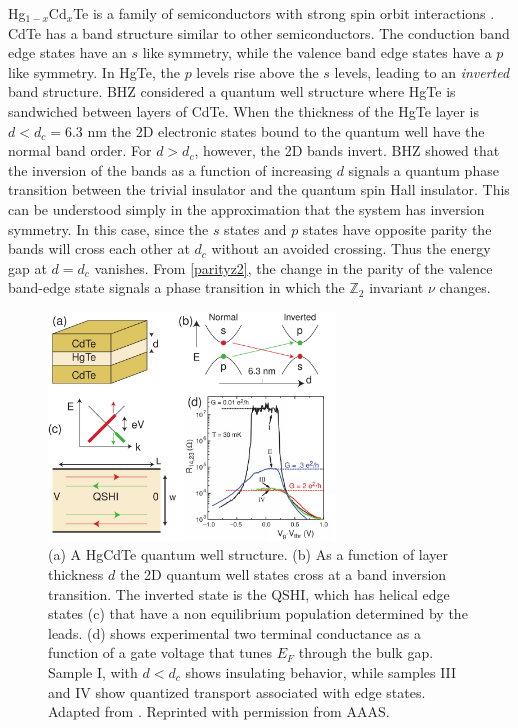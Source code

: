 \documentclass[twocolumn,floatfix,showpacs,rmp,aps]{revtex4}
\begin{document}
	
	Hg$_{1-x}$Cd$_x$Te is a family of semiconductors with strong spin orbit
	interactions \cite{dornhaus83}.  CdTe has a band structure similar to other
	semiconductors.  The conduction band edge states have an $s$ like symmetry,
	while the valence band edge states have a $p$ like symmetry.
	In HgTe, the $p$ levels rise above the $s$ levels, leading to an {\it inverted}
	band structure.  BHZ considered a quantum well structure where HgTe is
	sandwiched between layers of CdTe.  When the thickness of the HgTe layer is
	$d < d_c= 6.3$ nm the 2D electronic states bound to the quantum well have the
	normal band order.  For $d > d_c$, however, the 2D bands
	invert.  BHZ showed that the inversion of the bands as a function of increasing $d$ signals a
	quantum phase transition between the trivial insulator and the quantum spin
	Hall insulator.   This can be understood simply in the approximation that
	the system has inversion symmetry.  In this case, since the $s$ states
	and $p$ states have opposite parity the bands will cross each other at $d_c$ without
	an avoided crossing.  Thus the energy gap at $d=d_c$ vanishes.
	From \eqref{parityz2}, the change in the parity of
	the valence band-edge state signals a phase transition in which
	the $\mathbb{Z}_2$ invariant $\nu$ changes.
	
	\begin{figure}
		\includegraphics[width=3in]{Fig6}
		\caption{(a) A HgCdTe quantum well structure.  (b) As a function of layer thickness
			$d$ the 2D quantum well states cross at a band inversion transition.  The
			inverted state is the QSHI, which has helical edge states (c) that
			have a non equilibrium population determined by the leads.  (d) shows
			experimental two terminal conductance as a function of a gate voltage that
			tunes $E_F$ through the bulk gap.    Sample I, with $d<d_c$ shows insulating
			behavior, while samples III and IV show quantized transport associated with
			edge states.  Adapted from .  Reprinted with permission from AAAS.}
		\label{fig:hgcdtefig}
	\end{figure}
	
\end{document}
